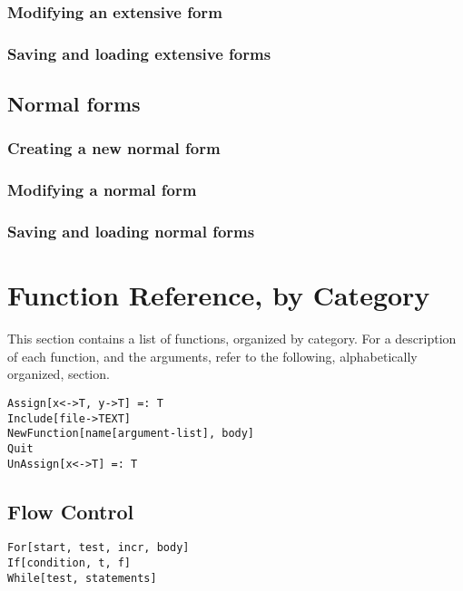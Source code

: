 \subsubsection{Modifying an extensive form}

\subsubsection{Saving and loading extensive forms}

\subsection{Normal forms}

\subsubsection{Creating a new normal form}

\subsubsection{Modifying a normal form}

\subsubsection{Saving and loading normal forms}

\section{Function Reference, by Category}

This section contains a list of functions, organized by
category.  For a description of each function, and the arguments,
refer to the following, alphabetically organized, section.

\begin{verbatim}
Assign[x<->T, y->T] =: T
Include[file->TEXT]
NewFunction[name[argument-list], body]
Quit
UnAssign[x<->T] =: T
\end{verbatim}

\subsection{Flow Control}

\begin{verbatim}
For[start, test, incr, body]
If[condition, t, f]
While[test, statements]
\end{verbatim}

